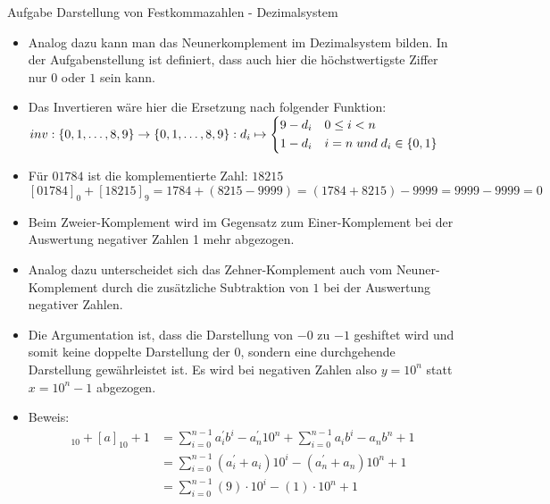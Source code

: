 \begin{frame}[allowframebreaks]{Aufgabe \thesection}{Darstellung von Festkommazahlen - Dezimalsystem}
\begin{solution}
\begin{itemize}
invertiert.
      \item Analog dazu kann man das Neunerkomplement im Dezimalsystem bilden. In der Aufgabenstellung ist definiert, dass auch hier die höchstwertigste Ziffer nur $0$ oder $1$ sein kann. 
      \item Das Invertieren wäre hier die Ersetzung nach folgender Funktion:\\[0.25cm] $inv : \{0, 1, \ldots, 8, 9\} \rightarrow \{0, 1, \ldots, 8, 9\} : d_i \mapsto \begin{dcases}
          9-d_i & 0\le i < n \\
          1-d_i & i = n\;und\;d_i\in\{0, 1\}
        \end{dcases}
        $
      \item Für $01784$ ist die komplementierte Zahl: $18215$\\[0.25cm]
        $[01784]_{0}+[18215]_{9}=1784+(8215-9999)=(1784+8215)-9999=9999-9999=0$
    \end{itemize}
  \end{solution}
  \begin{solutionnoinc}
    \begin{itemize}
        \item Beim Zweier-Komplement wird im Gegensatz zum Einer-Komplement bei der Auswertung negativer Zahlen 1 mehr abgezogen. 
        \item Analog dazu unterscheidet sich das Zehner-Komplement auch vom Neuner-Komplement durch die zusätzliche Subtraktion von $1$ bei der Auswertung negativer Zahlen. 
        \item Die Argumentation ist, dass die Darstellung von $-0$ zu $-1$ geshiftet wird und somit keine doppelte Darstellung der $0$, sondern eine durchgehende Darstellung gewährleistet ist. Es wird bei negativen Zahlen also $y = 10^n$ statt $x = 10^n - 1$ abgezogen.
    \end{itemize}
  \end{solutionnoinc}
  \begin{solution}
    \begin{itemize}
        \item \alert{Beweis:}
        \tiny
        \begin{align*}
            [a^{\prime}]_{10}+[a]_{10}+1&=\sum_{i=0}^{n-1}a_{i}^{\prime}b^{i}-a_{n}^{\prime}10^{n}+\sum_{i=0}^{n-1}a_{i}b^{i}-a_{n}b^{n}+1\\
            &=\sum_{i=0}^{n-1}(a_{i}^{\prime}+a_{i}){10^{i}}-(a_{n}^{\prime}+a_{n}){10^{n}}+1\\
            &=\sum_{i=0}^{n-1}(9)\cdot10^{i}-(1)\cdot10^{n}+1\\

\end{align*}
\end{itemize}
\end{solution}
\end{frame}
